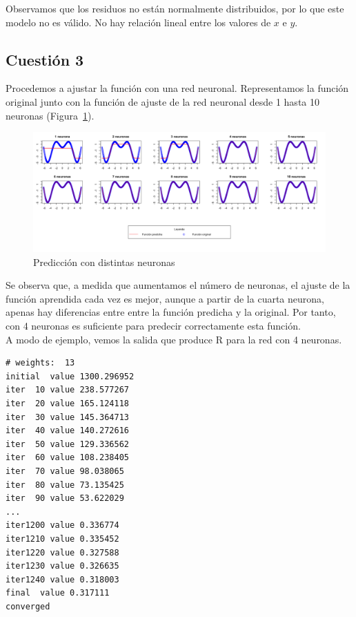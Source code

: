 \documentclass[12pt,a4paper,twoside,openright,titlepage,final]{article}
\begin{document}
Observamos que los residuos no están normalmente distribuidos, por lo que este modelo no es válido. No hay relación lineal entre los valores de $x$ e $y$.

\subsection{Cuestión 3}

Procedemos a ajustar la función con una red neuronal. Representamos la función original junto con la función de ajuste de la red neuronal desde 1 hasta 10 neuronas (Figura~\ref{fig:diferentes_neuronas}).\\

\begin{figure}[tbph!]
\centering
\includegraphics[width=1\linewidth]{imagenes/diferentes_neuronas}
\caption{Predicción con distintas neuronas}
\label{fig:diferentes_neuronas}
\end{figure}

Se observa que, a medida que aumentamos el número de neuronas, el ajuste de la función aprendida cada vez es mejor, aunque a partir de la cuarta neurona, apenas hay diferencias entre entre la función predicha y la original. Por tanto, con 4 neuronas es suficiente para predecir correctamente esta función.\\

A modo de ejemplo, vemos la salida que produce R para la red con 4 neuronas.

\begin{verbatim}
# weights:  13
initial  value 1300.296952 
iter  10 value 238.577267
iter  20 value 165.124118
iter  30 value 145.364713
iter  40 value 140.272616
iter  50 value 129.336562
iter  60 value 108.238405
iter  70 value 98.038065
iter  80 value 73.135425
iter  90 value 53.622029
...
iter1200 value 0.336774
iter1210 value 0.335452
iter1220 value 0.327588
iter1230 value 0.326635
iter1240 value 0.318003
final  value 0.317111 
converged
\end{verbatim}
\end{document}
